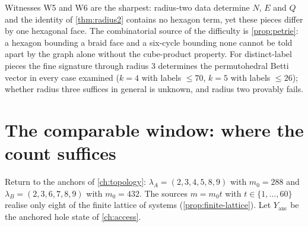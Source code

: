 Witnesses W5 and W6 are the sharpest: radius-two data determine $N$, $E$ and $Q$ and the identity of \cref{thm:radius2} contains no hexagon term, yet these pieces differ by one hexagonal face. The combinatorial source of the difficulty is \cref{prop:petrie}: a hexagon bounding a braid face and a six-cycle bounding none cannot be told apart by the graph alone without the cube-product property.
For distinct-label pieces the fine signature through radius $3$ determines the permutohedral Betti vector in every case examined ($k=4$ with labels $\le70$, $k=5$ with labels $\le26$); whether radius three suffices in general is unknown, and radius two provably fails.

\section{The comparable window: where the count suffices}\label{sec:window}
Return to the anchors of \cref{ch:topology}: $\lambda_A=(2,3,4,5,8,9)$ with $m_0=288$ and $\lambda_B=(2,3,6,7,8,9)$ with $m_0=432$. The sources $m=m_0t$ with $t\in\{1,\dots,60\}$ realise only eight of the finite lattice of systems (\cref{prop:finite-lattice}). Let $Y_{\mathrm{anc}}$ be the anchored hole state of \cref{ch:access}.
